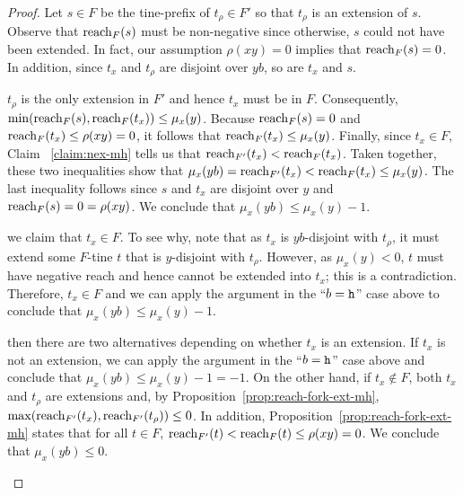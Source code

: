 \begin{proof}
    Let $s \in F$ be the tine-prefix of $t_\rho \in F'$ so that 
    $t_\rho$ is an extension of $s$. 
    Observe that $\operatorname{reach}_F(s)$ must be non-negative since 
    otherwise, $s$ could not have been extended. 
    In fact, our assumption $\rho(xy)=0$ implies that 
    $\operatorname{reach}_F(s) = 0$. 
    In addition, since $t_x$ and $t_\rho$ are disjoint over $yb$, 
    so are $t_x$ and $s$. 
    \begin{description}[font=\normalfont\itshape\space]
      \item[If $b = \h$,] 
      $t_\rho$ is the only extension in $F'$ and hence 
      $t_x$ must be in $F$. 
      Consequently, \\      
      $\min( \operatorname{reach}_F(s),\operatorname{reach}_F(t_x) ) \leq \mu_x(y)$. 
      Because $\operatorname{reach}_F(s)=0$ and $\operatorname{reach}_F(t_x) \leq \rho(xy)=0$, it follows that $\operatorname{reach}_F(t_x) \leq \mu_x(y)$. 
      Finally, since $t_x \in F$, 
      Claim ~\ref{claim:nex-mh} tells us that 
      $\operatorname{reach}_{F'}(t_x) < \operatorname{reach}_F(t_x)$. 
      Taken together, these two inequalities show that 
      $\mu_x(yb) = \operatorname{reach}_{F'}(t_x) < \operatorname{reach}_F(t_x) \leq \mu_x(y)$. 
      The last inequality follows since $s$ and $t_x$ are disjoint over $y$ and $\operatorname{reach}_F(s) = 0 = \rho(xy)$. 
      We conclude that $\mu_x(yb) \leq \mu_x(y) - 1$.

      \item[If $b = \H$ and $\mu_x(y) < 0$,] 
      we claim that $t_x \in F$. 
      To see why, note that as $t_x$ is $yb$-disjoint with $t_\rho$, 
      it must extend some $F$-tine $t$ that is $y$-disjoint with $t_\rho$. 
      However, as $\mu_x(y) < 0$, $t$ must have negative reach and hence cannot be extended into $t_x$; this is a contradiction. 
      Therefore, $t_x \in F$ and we can apply the argument in the ``$b = \h$'' case above 
      to conclude that $\mu_x(yb) \leq \mu_x(y) - 1$.

      \item[If $b = \H$ and $\mu_x(y) = 0$,] 
      then there are two alternatives depending on 
      whether $t_x$ is an extension. 
      If $t_x$ is not an extension, we can apply the argument in the ``$b = \h$'' case above and conclude that 
      $\mu_x(yb) \leq \mu_x(y) - 1 = -1$.
      On the other hand, if $t_x \not\in F$, 
      both $t_x$ and $t_\rho$ are extensions and, 
      by Proposition~\ref{prop:reach-fork-ext-mh}, 
      $\max(\operatorname{reach}_{F'}(t_x), \operatorname{reach}_{F'}(t_\rho) ) \leq 0$. 
      In addition, Proposition~\ref{prop:reach-fork-ext-mh} states that for all $t \in F$, 
      $\operatorname{reach}_{F'}(t) < \operatorname{reach}_{F}(t) \leq \rho(xy) = 0$. 
      We conclude that $\mu_x(yb) \leq 0$.


\end{description}
\end{proof}
